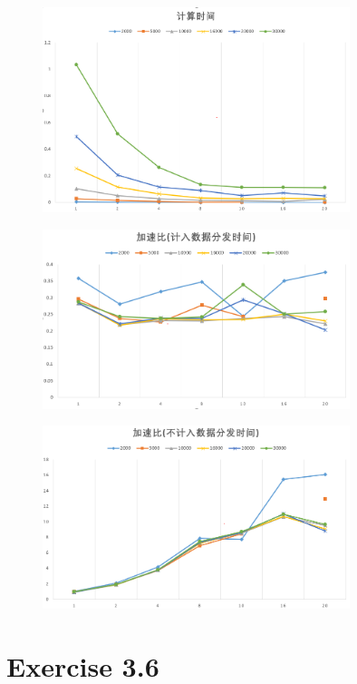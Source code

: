 \documentclass[UTF8, onecolumn, a4paper]{article}
\begin{document}
\begin{figure}[htb]
	\centering
	\includegraphics[width=0.8\textwidth]{hw3_5.png}
\end{figure}
\begin{figure}[htb]
	\centering
	\includegraphics[width=0.8\textwidth]{hw3_1.png}
\end{figure}
\begin{figure}[htb]
	\centering
	\includegraphics[width=0.8\textwidth]{hw3_2.png}
\end{figure}

\clearpage
\section{Exercise 3.6}
\end{document}
